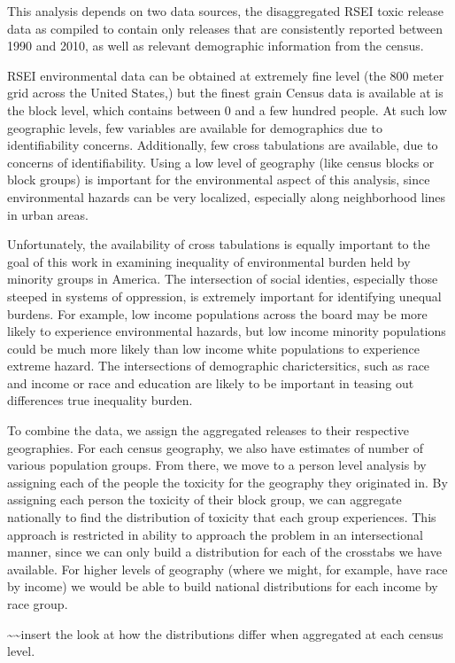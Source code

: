 \documentclass[12pt,twoside]{dukestatscithesis}
\theoremstyle{definition}
\theoremstyle{definition}
\theoremstyle{definition}
\theoremstyle{remark}
\begin{document}
This analysis depends on two data sources, the disaggregated RSEI toxic
release data as compiled to contain only releases that are consistently
reported between 1990 and 2010, as well as relevant demographic
information from the census.

RSEI environmental data can be obtained at extremely fine level (the 800
meter grid across the United States,) but the finest grain Census data
is available at is the block level, which contains between 0 and a few
hundred people. At such low geographic levels, few variables are
available for demographics due to identifiability concerns.
Additionally, few cross tabulations are available, due to concerns of
identifiability. Using a low level of geography (like census blocks or
block groups) is important for the environmental aspect of this
analysis, since environmental hazards can be very localized, especially
along neighborhood lines in urban areas.

Unfortunately, the availability of cross tabulations is equally
important to the goal of this work in examining inequality of
environmental burden held by minority groups in America. The
intersection of social identies, especially those steeped in systems of
oppression, is extremely important for identifying unequal burdens. For
example, low income populations across the board may be more likely to
experience environmental hazards, but low income minority populations
could be much more likely than low income white populations to
experience extreme hazard. The intersections of demographic
charictersitics, such as race and income or race and education are
likely to be important in teasing out differences true inequality
burden.

To combine the data, we assign the aggregated releases to their
respective geographies. For each census geography, we also have
estimates of number of various population groups. From there, we move to
a person level analysis by assigning each of the people the toxicity for
the geography they originated in. By assigning each person the toxicity
of their block group, we can aggregate nationally to find the
distribution of toxicity that each group experiences. This approach is
restricted in ability to approach the problem in an intersectional
manner, since we can only build a distribution for each of the crosstabs
we have available. For higher levels of geography (where we might, for
example, have race by income) we would be able to build national
distributions for each income by race group.

\textasciitilde{}\textasciitilde{}insert the look at how the
distributions differ when aggregated at each census level.
\end{document}
